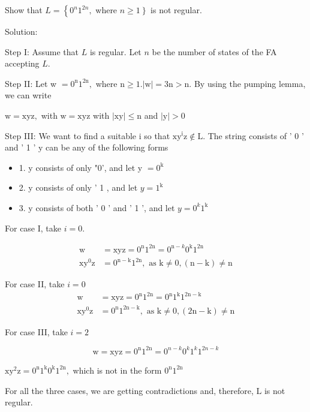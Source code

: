 \documentclass [7pt]{beamer}
\begin{document}
\begin{frame}
 Show that $L=\left\{0^{n} 1^{2 n},\right.$ where $\left.n \geq 1\right\}$ is not regular.
\begin{flushleft}
Solution:
\end{flushleft}
Step I: Assume that $L$ is regular. Let $n$ be the number of states of the FA accepting $L$.
\begin{flushleft}
Step II: Let w $=0^{\mathrm{n}} 1^{2 \mathrm{n}},$ where $\mathrm{n} \geq 1 .|\mathrm{w}|=3 \mathrm{n}>\mathrm{n} .$ By using the pumping lemma, we can write
\end{flushleft}
\begin{center}
$\mathrm{w}=\mathrm{xyz},$ with $\mathrm{w}=\mathrm{xyz}$ with $|\mathrm{xy}| \leq \mathrm{n}$ and $|\mathrm{y}|>0$
\end{center}
\begin{flushleft}
Step III: We want to find a suitable i so that $\mathrm{xy}^{\mathrm{i}} \mathrm{z} \notin \mathrm{L}$. The string consists of ' 0 ' and ' 1 ' $\mathrm{y}$ can be any
of the following forms
\end{flushleft}
\begin{itemize}
\item	
1. y consists of only "0', and let y $=0^{\text {k }}$
\item
2. y consists of only ' 1 , and let $y=1^{\text {k }}$
\item
3. y consists of both ' 0 ' and ' 1 ', and let $y=0^{k} 1^{\text {k }}$
\end{itemize}
For case I, take $i=0$.

$$
\begin{aligned}
	\mathrm{w} &=\mathrm{xyz}=0^{\mathrm{n}} 1^{2 \mathrm{n}}=0^{\mathrm{n}-k} 0^{\mathrm{k}} 1^{2 \mathrm{n}} \\
	\mathrm{xy}^{0} \mathrm{z} &=0^{\mathrm{n}-\mathrm{k}} 1^{2 \mathrm{n}}, \text { as } \mathrm{k} \neq 0,(\mathrm{n}-\mathrm{k}) \neq \mathrm{n}
\end{aligned}
$$
\end{frame}
\begin{frame}
For case II, take $i=0$
$$
\begin{aligned}
	\mathrm{w} &=\mathrm{xyz}=0^{\mathrm{n}} 1^{2 \mathrm{n}}=0^{\mathrm{n}} 1^{\mathrm{k}} 1^{2 \mathrm{n}-\mathrm{k}} \\
	\mathrm{xy}^{0} \mathrm{z} &=0^{\mathrm{n}} 1^{2 \mathrm{n}-\mathrm{k}}, \text { as } \mathrm{k} \neq 0,(2 \mathrm{n}-\mathrm{k}) \neq \mathrm{n}
\end{aligned}
$$


For case III, take $i=2$

$$
\mathrm{w}=\mathrm{xyz}=0^{\mathrm{n}} 1^{2 \mathrm{n}}=0^{n-k} 0^{k} 1^{k} 1^{2 n-k}
$$
\begin{center}
$\mathrm{xy}^{2} \mathrm{z}=0^{\mathrm{n}} 1^{\mathrm{k}} 0^{\mathrm{k}} 1^{2 \mathrm{n}},$ which is not in the form $0^{\mathrm{n}} 1^{2 \mathrm{n}}$
\end{center}

For all the three cases, we are getting contradictions and, therefore, $\mathrm{L}$ is not regular.	

\end{frame}
\end{document}
